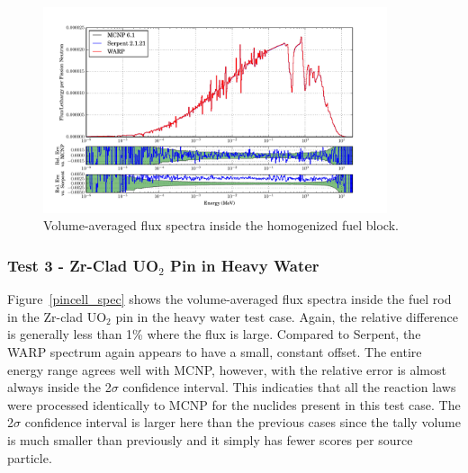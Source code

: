 \documentclass[preprint,12pt]{elsarticle}
\begin{document}
\begin{figure}[h!]
\centering
\includegraphics[width=0.9\textwidth,trim= 1cm 0cm 1cm 0cm]{graphics/homfuel_spec.pdf}
\caption{Volume-averaged flux spectra inside the homogenized fuel block. \label{homfuel_spec} }
\end{figure}

\newpage
\subsubsection{Test 3 - Zr-Clad UO$_2$ Pin in Heavy Water}

Figure~\ref{pincell_spec} shows the volume-averaged flux spectra inside the fuel rod in the Zr-clad UO$_2$ pin in the heavy water test case.  Again, the relative difference is generally less than 1\% where the flux is large.  Compared to Serpent, the WARP spectrum again appears to have a small, constant offset.  The entire energy range agrees well with MCNP, however, with the relative error is almost always inside the 2$\sigma$ confidence interval.  This indicaties that all the reaction laws were processed identically to MCNP for the nuclides present in this test case.  The 2$\sigma$ confidence interval is larger here than the previous cases since the tally volume is much smaller than previously and it simply has fewer scores per source particle.

\end{document}
